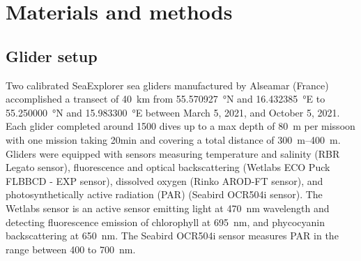 \documentclass[../Main.tex]{subfiles}
\begin{document}
\section*{\crule[blue]{.3cm}{.3cm} Materials and methods}
\subsection*{\crule[blue]{.2cm}{.2cm} Glider setup}
Two calibrated SeaExplorer sea gliders manufactured by Alseamar (France) accomplished a transect of \SI{40}{km} from \SI{55.570927}{\degree}N and \SI{16.432385}{\degree}E to \SI{55.250000}{\degree}N and \SI{15.983300}{\degree}E between March 5, 2021, and October 5, 2021. 
Each glider completed around 1500 dives up to a max depth of \SI{80}{m} per missoon with one mission taking 20min and covering a total distance of \SIrange{300}{400}{m}.  
\\ 
Gliders were equipped with sensors measuring temperature and salinity (RBR Legato sensor), fluorescence and optical backscattering (Wetlabs ECO Puck FLBBCD - EXP sensor), dissolved oxygen (Rinko AROD-FT sensor), and photosynthetically active radiation (PAR) (Seabird OCR504i sensor). 
The Wetlabs sensor is an active sensor emitting light at \SI{470}{nm} wavelength and detecting fluorescence emission of chlorophyll at \SI{695}{nm}, and phycocyanin backscattering at \SI{650}{nm}. 
The Seabird OCR504i sensor measures PAR in the range between 400 to \SI{700}{nm}\supercite{ACSA2014}.
\end{document}
